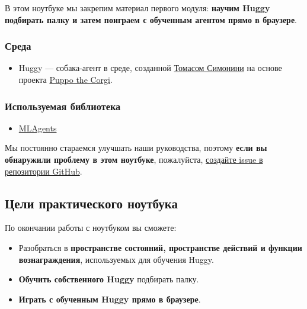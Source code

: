 \documentclass[11pt,a4paper]{article}
\begin{document}
В этом ноутбуке мы закрепим материал первого модуля: \textbf{научим Huggy подбирать палку и затем поиграем с обученным агентом прямо в браузере}.


\subsubsection{Среда}\label{the-environment}

\begin{itemize}
\tightlist
\item
  Huggy --- собака-агент в среде, созданной \href{https://twitter.com/ThomasSimonini}{Томасом Симонини} на основе проекта \href{https://blog.unity.com/technology/puppo-the-corgi-cuteness-overload-with-the-unity-ml-agents-toolkit}{Puppo the Corgi}.
\end{itemize}

\subsubsection{Используемая библиотека}\label{the-library-used}

\begin{itemize}
\tightlist
\item
  \href{https://github.com/Unity-Technologies/ml-agents}{MLAgents}
\end{itemize}

Мы постоянно стараемся улучшать наши руководства, поэтому \textbf{если вы обнаружили проблему в этом ноутбуке}, пожалуйста, \href{https://github.com/huggingface/deep-rl-class/issues}{создайте issue в репозитории GitHub}.

\subsection{Цели практического ноутбука}\label{objectives-of-this-notebook}

По окончании работы с ноутбуком вы сможете:

\begin{itemize}
\tightlist
\item
  Разобраться в \textbf{пространстве состояний, пространстве действий и функции вознаграждения}, используемых для обучения Huggy.
\item
  \textbf{Обучить собственного Huggy} подбирать палку.
\item
  \textbf{Играть с обученным Huggy прямо в браузере}.
\end{itemize}
\end{document}
